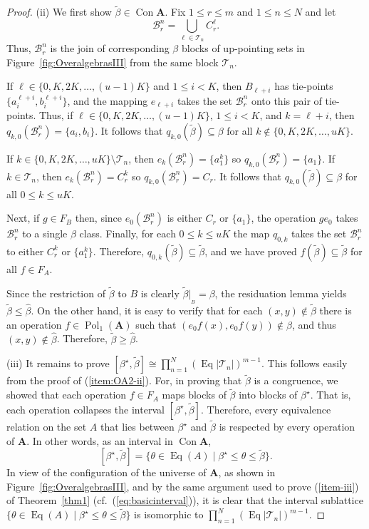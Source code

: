 \documentclass{au}
\numberwithin{equation}{section}
\theoremstyle{plain}
\theoremstyle{definition}
\newcommand{\suchthat}{\ensuremath{\mid}}  %
\newcommand{\defeq}{\ensuremath{=}}        %
\newcommand{\<}{\ensuremath{\langle}}
\renewcommand{\>}{\ensuremath{\rangle}}
\newcommand{\bA}{\ensuremath{\mathbf{A}}}
\newcommand{\sB}{\ensuremath{\mathcal{B}}}
\newcommand{\sT}{\ensuremath{\mathscr{T}}}
\DeclareMathOperator{\Eq}{Eq}
\DeclareMathOperator{\Con}{Con}
\DeclareMathOperator{\Pol}{Pol}
\renewcommand{\leq}{\ensuremath{\leqslant}}
\renewcommand{\geq}{\ensuremath{\geqslant}}
\newcommand{\resB}{\ensuremath{|_{_B}}}
\newcommand{\tbeta}{\ensuremath{\widetilde{\beta}}}
\newcommand{\hbeta}{\ensuremath{\widehat{\beta}}}
\newcommand{\CE}{\ensuremath{\sB_r^n}}
\begin{document}
\begin{proof}
\smallskip %
(ii) We first show $\tbeta\in \Con\bA$.
Fix $1\leq r \leq m$ and $1\leq n\leq N$ and let
\[
\CE\defeq  \bigcup_{\ell \in \sT_n} C_r^\ell.
\]
Thus, $\CE$ is the join of corresponding %
$\beta$ blocks of
up-pointing sets in Figure~\ref{fig:OveralgebrasIII} from the same block
$\sT_n$.

If $\ell \in \{0, K, 2K, \dots, (u-1)K\}$ and $1\leq i< K$, then $B_{\ell+i}$ has tie-points
$\{a_i^{\ell+i}, b_i^{\ell+i}\}$, and the mapping $e_{\ell+i}$ takes the set
$\CE$ onto this pair of tie-points.
Thus, if $\ell \in \{0, K, 2K, \dots, (u-1)K\}$, $1\leq i< K$, and
$k=\ell+i$, then
$q_{k,0}(\CE) = \{a_i, b_i\}$.
It follows that $q_{k,0}(\tbeta)\subseteq \beta$ for all
$k\notin \{0, K, 2K, \dots, uK\}$.

If $k\in \{0, K, 2K, \dots, uK\}\setminus \sT_n$, then
$e_k(\CE) = \{a_1^k\}$ so
$q_{k,0}(\CE) = \{a_1\}$. If
$k\in \sT_n$, then $e_k(\CE) = C_r^k$ so $q_{k,0}(\CE) = C_r$.  It follows that
$q_{k,0}(\tbeta)\subseteq \beta$ for all $0\leq k \leq uK$.

Next, if $g\in F_B$ then, since $e_{0}(\CE)$ is either $C_r$ or
$\{a_1\}$, the operation
$ge_0$ takes $\CE$ to a single $\beta$ class.
Finally, for each $0 \leq k \leq uK$ the map
$q_{0,k}$ takes the set $\CE$ to either $C_r^k$ or $\{a_1^k\}$.
Therefore, $q_{0,k}(\tbeta)\subseteq \tbeta$, and we have proved
$f(\tbeta)\subseteq \tbeta$ for all $f\in F_A$.

Since the
restriction of $\tbeta$ to $B$ is clearly $\tbeta \resB = \beta$, the
residuation lemma yields $\tbeta \leq \hbeta$.  On the other hand, it is
easy to verify that for each $(x,y)\notin
\tbeta$ there is an operation $f\in \Pol_1(\bA)$ such that $(e_0f(x),
e_0f(y))\notin \beta$, and thus $(x,y)\notin \hbeta$.  Therefore, $\tbeta \geq \hbeta$.

\smallskip %
(iii) It remains to prove
$[\beta^\star, \tbeta] \cong \prod_{n=1}^N(\Eq|\sT_n|)^{m-1}$.
This follows easily from the proof of (\ref{item:OA2-ii}).  For,
in proving that $\tbeta$ is a congruence, we showed that each
operation $f\in F_A$ maps blocks of $\tbeta$ into blocks of
$\beta^\star$.  That is, each operation collapses the interval $[\beta^\star,
\tbeta]$.  Therefore, every equivalence relation on the set $A$ that lies
between $\beta^\star$ and $\tbeta$ is respected by every operation of $\bA$. In
other words, as an interval in $\Con \bA$,
\[
[\beta^\star, \tbeta] = \{\theta \in \Eq(A)\suchthat \beta^\star \leq \theta \leq \tbeta\}.
\]
In view of the configuration of the universe of $\bA$,
as shown in Figure~\ref{fig:OveralgebrasIII}, and by the same argument used to prove
(\ref{item-iii}) of Theorem~\ref{thm1} (cf.~(\ref{eq:basicinterval})),
it is clear that the interval sublattice
$\{\theta \in \Eq(A)\suchthat \beta^\star \leq \theta \leq \tbeta\}$
is isomorphic to $\prod_{n=1}^N(\Eq|\sT_n|)^{m-1}$.
\end{proof}
\end{document}
